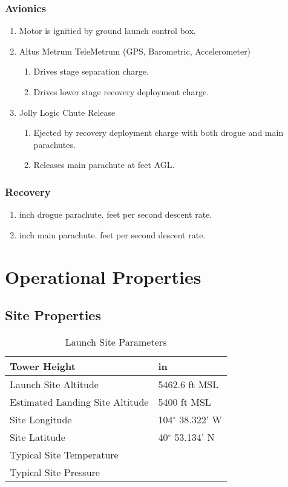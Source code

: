 \documentclass[12pt]{article}
\newcommand{\ph}{\framebox[48pt]{\rule{0pt}{12pt}}}
\begin{document}
\subsubsection{Avionics}
\begin{enumerate}[label=(\alph*)]
    \item Motor is ignitied by ground launch control box.
    \item Altus Metrum TeleMetrum (GPS, Barometric, Accelerometer)
    \begin{enumerate}[label=(\arabic*)]
        \item Drives stage separation charge.
        \item Drives lower stage recovery deployment charge.
    \end{enumerate}
    \item Jolly Logic Chute Release
    \begin{enumerate}[label=(\arabic*)]
        \item Ejected by recovery deployment charge with both drogue and main parachutes.
        \item Releases main parachute at \ph feet AGL.
    \end{enumerate}
\end{enumerate}
\subsubsection{Recovery}
\begin{enumerate}[label=(\alph*)]
    \item \ph inch drogue parachute. \ph feet per second descent rate.
    \item \ph inch main parachute. \ph feet per second descent rate.
\end{enumerate}
\section{Operational Properties}
\subsection{Site Properties}
\begin{table}[H]
    \centering
    \caption{Launch Site Parameters}
    \begin{tabular}{|l|l|}
        \hline
        Tower Height & \ph in \\ \hline
        Launch Site Altitude & 5462.6 ft MSL \\ \hline
        Estimated Landing Site Altitude & 5400 ft MSL \\ \hline
        Site Longitude & 104$^\circ$ 38.322' W \\ \hline
        Site Latitude & 40$^\circ$ 53.134' N \\ \hline
        Typical Site Temperature & \ph \\ \hline
        Typical Site Pressure & \ph \\ \hline
    \end{tabular}
\end{table}
\end{document}

